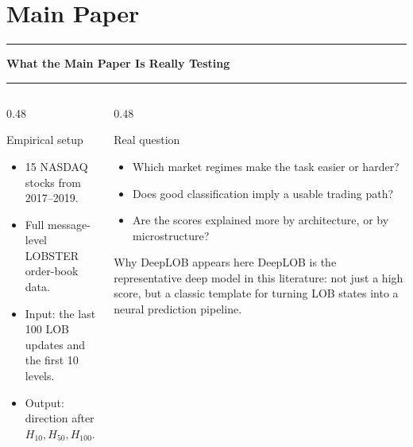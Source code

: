 \documentclass[aspectratio=169,10pt]{beamer}
\newcommand{\tightitems}{\setlength{\itemsep}{0.35em}}
\newcommand{\contentheader}[1]{%
  \vspace*{0.05em}%
  {\noindent\color{BrandOrange}\rule{0.42em}{0.42em}\hspace{0.50em}\bfseries\Large #1\par}%
  \vspace{0.15em}%
  {\color{BrandOrange}\rule{\textwidth}{1.4pt}\par}%
  \vspace{0.42em}%
}
\begin{document}
\section{Main Paper}
\begin{frame}[plain]
\contentheader{What the Main Paper Is Really Testing}
\begin{columns}[T,totalwidth=\textwidth]
\begin{column}{0.48\textwidth}
\begin{block}{Empirical setup}
\begin{itemize}\tightitems
  \item 15 NASDAQ stocks from 2017--2019.
  \item Full message-level LOBSTER order-book data.
  \item Input: the last 100 LOB updates and the first 10 levels.
  \item Output: direction after \(H_{10},H_{50},H_{100}\).
\end{itemize}
\end{block}
\end{column}
\begin{column}{0.48\textwidth}
\begin{block}{Real question}
\begin{itemize}\tightitems
  \item Which market regimes make the task easier or harder?
  \item Does good classification imply a usable trading path?
  \item Are the scores explained more by architecture, or by microstructure?
\end{itemize}
\end{block}
\begin{block}{Why DeepLOB appears here}
DeepLOB is the representative deep model in this literature: not just a high score, but a classic template for turning LOB states into a neural prediction pipeline.
\end{block}
\end{column}
\end{columns}
\vspace{0.35em}
\centering
{}
\end{frame}
\end{document}
